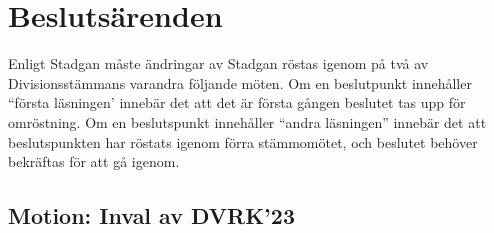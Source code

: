 \documentclass[protokoll]{dvd}
\begin{document}
% 
% 
% 
% 
% 
% 
% 
% 
% 
% 
% 
% 
% 
\section{Beslutsärenden}

Enligt Stadgan måste ändringar av Stadgan röstas igenom på två av Divisionsstämmans varandra följande möten.
Om en beslutpunkt innehåller ``första läsningen' innebär det att det är första gången beslutet tas upp för omröstning.
Om en beslutspunkt innehåller ``andra läsningen'' innebär det att beslutspunkten har röstats igenom förra stämmomötet, och beslutet behöver bekräftas för att gå igenom.

\subsection{Motion: Inval av DVRK'23}
\end{document}
